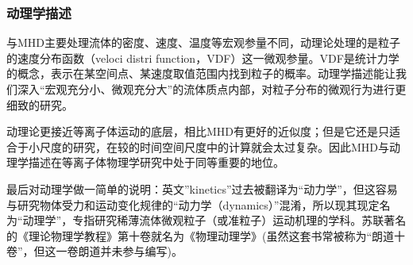 			\subsubsection{动理学描述}
			\hspace{2em}与MHD主要处理流体的密度、速度、温度等宏观参量不同，动理论处理的是粒子的速度分布函数（veloci distri function，VDF）这一微观参量。VDF是统计力学的概念，表示在某空间点、某速度取值范围内找到粒子的概率。动理学描述能让我们深入“宏观充分小、微观充分大”的流体质点内部，对粒子分布的微观行为进行更细致的研究。
			
			动理论更接近等离子体运动的底层，相比MHD有更好的近似度；但是它还是只适合于小尺度的研究，在较的时间空间尺度中的计算就会太过复杂。因此MHD与动理学描述在等离子体物理学研究中处于同等重要的地位。
			
			最后对动理学做一简单的说明：英文”kinetics”过去被翻译为“动力学”，但这容易与研究物体受力和运动变化规律的“动力学（dynamics）”混淆，所以现其现定名为“动理学”，专指研究稀薄流体微观粒子（或准粒子）运动机理的学科。苏联著名的《理论物理学教程》第十卷就名为《物理动理学》(虽然这套书常被称为“朗道十卷”，但这一卷朗道并未参与编写)。
			






